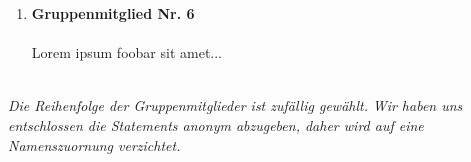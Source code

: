 \documentclass[a4paper]{article}
\begin{document}
\begin{enumerate}
    \item \textbf{Gruppenmitglied Nr. 6}\\
    \\
    Lorem ipsum foobar sit amet...\\
    \\

\end{enumerate}

\textit{Die Reihenfolge der Gruppenmitglieder ist zufällig gewählt.}
\textit{Wir haben uns entschlossen die Statements anonym abzugeben, daher wird auf eine Namenszuornung verzichtet.}

\end{document}
